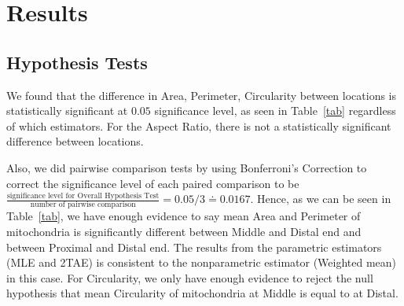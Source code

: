 \documentclass{article}\usepackage[]{graphicx}\usepackage[]{color}
\numberwithin{figure}{subsection} %
\numberwithin{table}{subsection} %
\begin{document}
\setcounter{section}{6}
\setcounter{page}{28}

\section{Results}
\subsection{Hypothesis Tests}









We found that the difference in Area, Perimeter, Circularity between locations is statistically significant at $0.05$ significance level, as seen in Table~\ref{tab} regardless of which estimators. For the Aspect Ratio, there is not a statistically significant difference between locations. 

Also, we did pairwise comparison tests by using Bonferroni's Correction to correct the significance level of each paired comparison to be $\frac{\text{significance level for Overall Hypothesis Test}}{\text{number of pairwise comparison}} = 0.05/3 \doteq 0.0167$. Hence, as we can be seen in Table~\ref{tab}, we have enough evidence to say mean Area and Perimeter of mitochondria is significantly different between Middle and Distal end and between Proximal and Distal end. The results from the parametric estimators (MLE and 2TAE) is consistent to the nonparametric estimator (Weighted mean) in this case. For Circularity, we only have enough evidence to reject the null hypothesis that mean Circularity of mitochondria at Middle is equal to at Distal.
\end{document}
